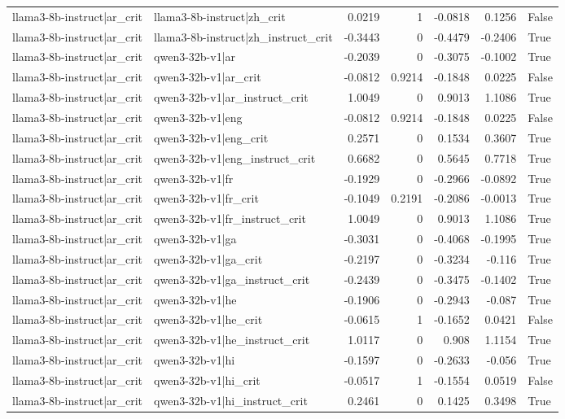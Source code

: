 \begin{table}
\begin{tabular}{l l r r r r l}
llama3-8b-instruct|ar_crit & llama3-8b-instruct|zh_crit & 0.0219 & 1 & -0.0818 & 0.1256 & False \\
llama3-8b-instruct|ar_crit & llama3-8b-instruct|zh_instruct_crit & -0.3443 & 0 & -0.4479 & -0.2406 & True \\
llama3-8b-instruct|ar_crit & qwen3-32b-v1|ar & -0.2039 & 0 & -0.3075 & -0.1002 & True \\
llama3-8b-instruct|ar_crit & qwen3-32b-v1|ar_crit & -0.0812 & 0.9214 & -0.1848 & 0.0225 & False \\
llama3-8b-instruct|ar_crit & qwen3-32b-v1|ar_instruct_crit & 1.0049 & 0 & 0.9013 & 1.1086 & True \\
llama3-8b-instruct|ar_crit & qwen3-32b-v1|eng & -0.0812 & 0.9214 & -0.1848 & 0.0225 & False \\
llama3-8b-instruct|ar_crit & qwen3-32b-v1|eng_crit & 0.2571 & 0 & 0.1534 & 0.3607 & True \\
llama3-8b-instruct|ar_crit & qwen3-32b-v1|eng_instruct_crit & 0.6682 & 0 & 0.5645 & 0.7718 & True \\
llama3-8b-instruct|ar_crit & qwen3-32b-v1|fr & -0.1929 & 0 & -0.2966 & -0.0892 & True \\
llama3-8b-instruct|ar_crit & qwen3-32b-v1|fr_crit & -0.1049 & 0.2191 & -0.2086 & -0.0013 & True \\
llama3-8b-instruct|ar_crit & qwen3-32b-v1|fr_instruct_crit & 1.0049 & 0 & 0.9013 & 1.1086 & True \\
llama3-8b-instruct|ar_crit & qwen3-32b-v1|ga & -0.3031 & 0 & -0.4068 & -0.1995 & True \\
llama3-8b-instruct|ar_crit & qwen3-32b-v1|ga_crit & -0.2197 & 0 & -0.3234 & -0.116 & True \\
llama3-8b-instruct|ar_crit & qwen3-32b-v1|ga_instruct_crit & -0.2439 & 0 & -0.3475 & -0.1402 & True \\
llama3-8b-instruct|ar_crit & qwen3-32b-v1|he & -0.1906 & 0 & -0.2943 & -0.087 & True \\
llama3-8b-instruct|ar_crit & qwen3-32b-v1|he_crit & -0.0615 & 1 & -0.1652 & 0.0421 & False \\
llama3-8b-instruct|ar_crit & qwen3-32b-v1|he_instruct_crit & 1.0117 & 0 & 0.908 & 1.1154 & True \\
llama3-8b-instruct|ar_crit & qwen3-32b-v1|hi & -0.1597 & 0 & -0.2633 & -0.056 & True \\
llama3-8b-instruct|ar_crit & qwen3-32b-v1|hi_crit & -0.0517 & 1 & -0.1554 & 0.0519 & False \\
llama3-8b-instruct|ar_crit & qwen3-32b-v1|hi_instruct_crit & 0.2461 & 0 & 0.1425 & 0.3498 & True \\

\end{tabular}
\end{table}
